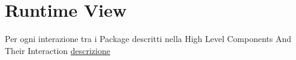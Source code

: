 \documentclass[../../../../dd.tex]{subfiles}
\begin{document}
	\section{Runtime View}
		Per ogni interazione tra i Package descritti nella High Level Components And Their Interaction
		\href{https://en.wikipedia.org/wiki/Sequence_diagram}{descrizione}
	
\end{document}
